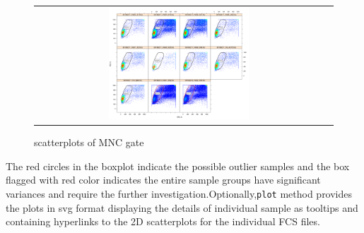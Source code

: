 \documentclass[10pt]{bmc_article}
\newenvironment{bmcformat}{\baselineskip20pt\sloppy\setboolean{publ}{false}}{\baselineskip20pt\sloppy}
\begin{document}
\begin{bmcformat}
\begin{figure}[h]
\begin{tabular}{cc}
\includegraphics[width=0.5\textwidth]{image/s_8780_MNC_proportion.png}
\end{tabular}
\caption{scatterplots of MNC gate} 
\end{figure}
The red circles in the boxplot indicate the possible outlier samples and the box
flagged with red color indicates the entire sample groups have significant
variances and require the further investigation.Optionally,\texttt{plot} method
provides the plots in svg format displaying the
details of individual sample as tooltips and containing hyperlinks to the
2D scatterplots for the individual FCS files.
			

\end{bmcformat}
\end{document}
